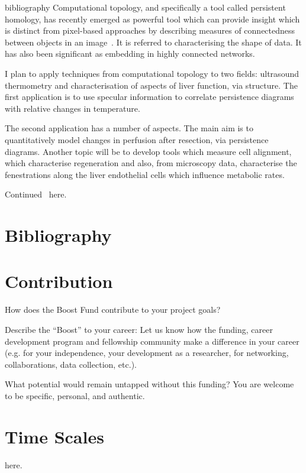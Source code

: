 \begin{btUnit}
\begin{btSect}{bibliography}
Computational topology, and specifically a tool called persistent homology, has recently emerged as powerful tool which can provide insight which is distinct from pixel-based approaches by describing measures of connectedness between objects in an image~. It is referred to characterising the shape of data.  It has also been significant as embedding in highly connected networks. 

I plan to apply techniques from computational topology to two fields: \textcolor{custom}{ultrasound thermometry} and \textcolor{custom}{characterisation of aspects of liver function}, via structure. The first application is to use specular information to correlate persistence diagrams with relative changes in temperature. 

The second application has a number of aspects. The main aim is to quantitatively model changes in perfusion after resection, via persistence diagrams. Another topic will be to develop tools which measure cell alignment, which characterise regeneration and also, from microscopy data, characterise the fenestrations along the liver endothelial cells which influence metabolic rates.

\newpage
Continued~\cite{ravishankar2023sonosamtrack} here.

\newpage
\section{Bibliography}

\btPrintCited 

\end{btSect} 
\end{btUnit} 





\newpage
\section{Contribution}

How does the Boost Fund contribute to your project goals?  

Describe the \enquote{Boost} to your career: Let us know how the funding, career development program and fellowship community make a difference in your career (e.g. for your independence, your development as a researcher, for networking, collaborations, data collection, etc.).  

What potential would remain untapped without this funding? You are welcome to be specific, personal, and authentic. 



%



\newpage
\section{Time Scales}
here.




